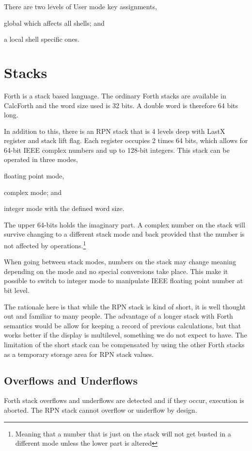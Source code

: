 \documentclass[a4paper]{article}
\begin{document}
There are two levels of User mode key assignments,
\begin{inparaenum}
\item global which affects all shells;  and
\item a local shell specific ones.
\end{inparaenum}


\section{Stacks}
Forth is a stack based language. The ordinary Forth stacks are available in CalcForth and the word size used is 32 bits. A double word is therefore 64 bits long.

In addition to this, there is an RPN stack that is 4 levels deep with LastX register and stack lift flag.
Each register occupies 2 times 64 bits, which allows for 64-bit IEEE complex numbers and up to 128-bit integers.
This stack can be operated in three modes,
\begin{inparaenum}
\item  floating point mode,
\item complex mode; and
\item integer mode with the defined word size.
\end{inparaenum}

The upper 64-bits holds the imaginary part. A complex number on the stack will survive changing to a different stack mode and back provided that the number is not affected by operations.\footnote{Meaning that a number that is just on the stack will not get busted in a different mode unless the lower part is altered}

When going between stack modes, numbers on the stack may change meaning depending on the mode and no special conversions take place. This make it possible to switch to integer mode to manipulate IEEE floating point number at bit level.

The rationale here is that while the RPN stack is kind of short, it is well thought out and familiar to many people. The advantage of a longer stack with Forth semantics would be allow for keeping a record of previous calculations, but that works better if the display is multilevel, something we do not expect to have. The limitation of the short stack can be compensated by using the other Forth stacks as a temporary storage area for RPN stack values.

\subsection{Overflows and Underflows}
Forth stack overflows and underflows are detected and if they occur, execution is aborted.  The RPN stack cannot overflow or underflow by design.
\end{document}

